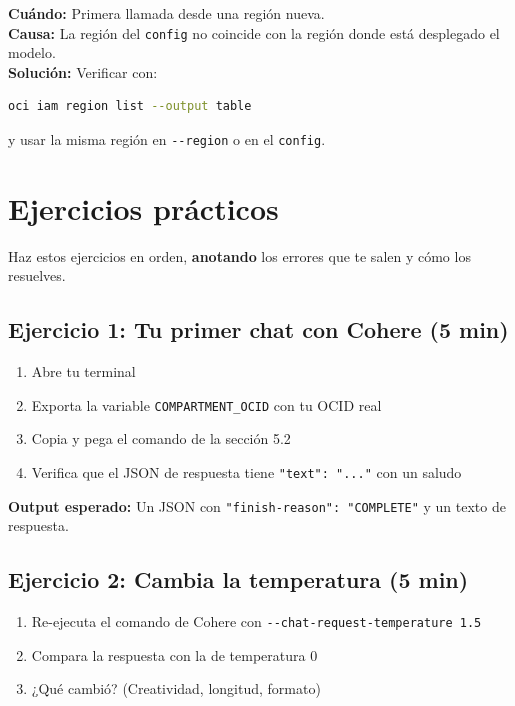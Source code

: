 \documentclass[11pt,a4paper,oneside]{article}
\begin{document}
\begin{tcolorbox}[colback=errred!5!white,colframe=errred,breakable,title={Error 7: ``404 Not Found'' o timeout en llamada al API}]
\textbf{Cuándo:} Primera llamada desde una región nueva. \\
\textbf{Causa:} La región del \texttt{config} no coincide con la región donde está desplegado el modelo. \\
\textbf{Solución:} Verificar con:
\begin{lstlisting}[language=bash]
oci iam region list --output table
\end{lstlisting}
y usar la misma región en \texttt{-{}-region} o en el \texttt{config}.
\end{tcolorbox}

\section{Ejercicios prácticos}

Haz estos ejercicios en orden, \textbf{anotando} los errores que te salen y cómo los resuelves.

\subsection{Ejercicio 1: Tu primer chat con Cohere (5 min)}

\begin{enumerate}
  \item Abre tu terminal
  \item Exporta la variable \texttt{COMPARTMENT\_OCID} con tu OCID real
  \item Copia y pega el comando de la sección 5.2
  \item Verifica que el JSON de respuesta tiene \texttt{"text": "..."} con un saludo
\end{enumerate}

\textbf{Output esperado:} Un JSON con \texttt{"finish-reason": "COMPLETE"} y un texto de respuesta.

\subsection{Ejercicio 2: Cambia la temperatura (5 min)}

\begin{enumerate}
  \item Re-ejecuta el comando de Cohere con \texttt{-{}-chat-request-temperature 1.5}
  \item Compara la respuesta con la de temperatura 0
  \item ¿Qué cambió? (Creatividad, longitud, formato)
\end{enumerate}
\end{document}
